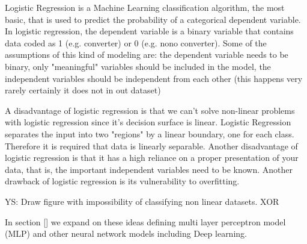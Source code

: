 \documentclass[11pt]{article}
\begin{document}





Logistic Regression is a Machine Learning classification algorithm, the most basic, that is used to predict the probability of a categorical dependent variable. 
In logistic regression, the dependent variable is a binary variable that contains data coded as 1 (e.g. converter) or 0 (e.g. nono converter).
Some of the assumptions of this kind of modeling are: the dependent variable needs to be binary, only "meaningful" variables should be included in the model, the independent variables should be independent from each other (this happens very rarely certainly it does not in out dataset) 

A disadvantage of logistic regression is that we can’t solve non-linear problems with logistic regression since it’s decision surface is linear. 
Logistic Regression separates the input into two "regions" by a linear boundary, one for each class. Therefore it is required that data is linearly separable. Another disadvantage of logistic regression is that it has a high reliance on a proper presentation of your data, that is, the important independent variables need to be known. Another drawback of logistic regression is its vulnerability to overfitting.

YS: Draw figure with impossibility of classifying non linear datasets. XOR


In section \ref{} we expand on these ideas defining multi layer perceptron model (MLP) and other neural network models including Deep learning.
\end{document}
